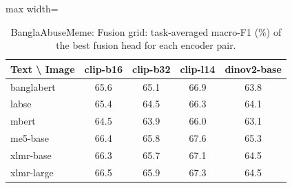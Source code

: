 \begin{table}[t]
\centering
\small
\caption{BanglaAbuseMeme: Fusion grid: task-averaged macro-F1 (\%) of the best fusion head for each encoder pair.}
\label{tab:grid_fine_banglaabusememe}
\begin{adjustbox}{max width=\columnwidth}
\begin{tabular}{lcccc}
\toprule
Text \textbackslash{} Image & clip-b16 & clip-b32 & clip-l14 & dinov2-base \\
\midrule
banglabert & 65.6 & 65.1 & 66.9 & 63.8 \\
labse & 65.4 & 64.5 & 66.3 & 64.1 \\
mbert & 64.5 & 63.9 & 66.0 & 63.1 \\
me5-base & 66.4 & 65.8 & 67.6 & 65.3 \\
xlmr-base & 66.3 & 65.7 & 67.1 & 64.5 \\
xlmr-large & 66.5 & 65.9 & 67.3 & 64.5 \\
\bottomrule
\end{tabular}
\end{adjustbox}
\end{table}
